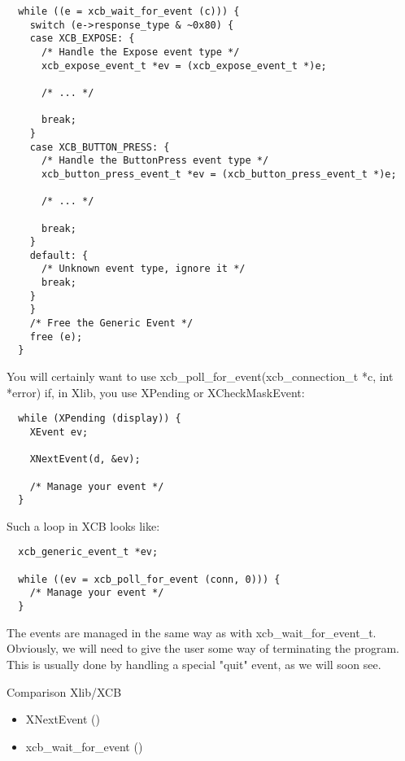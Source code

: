 \documentclass[12pt,oneside,titlepage]{book}
\providecommand{\tightlist}{%
  \setlength{\itemsep}{0pt}\setlength{\parskip}{0pt}}
\begin{document}
\begin{enumerate}
\begin{enumerate}
\begin{verbatim}
  while ((e = xcb_wait_for_event (c))) {
    switch (e->response_type & ~0x80) {
    case XCB_EXPOSE: {
      /* Handle the Expose event type */
      xcb_expose_event_t *ev = (xcb_expose_event_t *)e;

      /* ... */

      break;
    }
    case XCB_BUTTON_PRESS: {
      /* Handle the ButtonPress event type */
      xcb_button_press_event_t *ev = (xcb_button_press_event_t *)e;

      /* ... */

      break;
    }
    default: {
      /* Unknown event type, ignore it */
      break;
    }
    }
    /* Free the Generic Event */
    free (e);
  }
\end{verbatim}

    You will certainly want to use
    {xcb\_poll\_for\_event(xcb\_connection\_t *c, int *error)} if, in
    Xlib, you use {XPending} or {XCheckMaskEvent}:

\begin{verbatim}
  while (XPending (display)) {
    XEvent ev;

    XNextEvent(d, &ev);

    /* Manage your event */
  }
\end{verbatim}

    Such a loop in XCB looks like:

\begin{verbatim}
  xcb_generic_event_t *ev;

  while ((ev = xcb_poll_for_event (conn, 0))) {
    /* Manage your event */
  }
\end{verbatim}

    The events are managed in the same way as with
    {xcb\_wait\_for\_event\_t}. Obviously, we will need to give the user
    some way of terminating the program. This is usually done by
    handling a special "quit" event, as we will soon see.

    Comparison Xlib/XCB

    \begin{itemize}
    \tightlist
    \item
      XNextEvent ()
    \end{itemize}

    \begin{itemize}
    \tightlist
    \item
      xcb\_wait\_for\_event ()
    \end{itemize}


\end{enumerate}
\end{enumerate}
\end{document}
